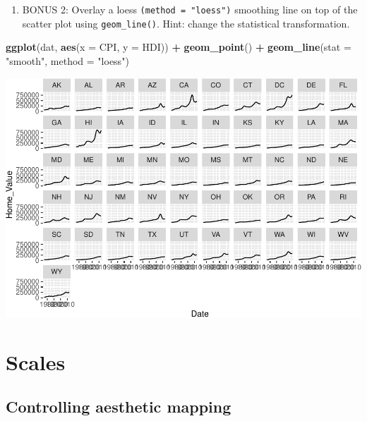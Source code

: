 \documentclass[]{book}
\newenvironment{Shaded}{\begin{snugshade}}{\end{snugshade}}
\newcommand{\DataTypeTok}[1]{\textcolor[rgb]{0.13,0.29,0.53}{#1}}
\newcommand{\KeywordTok}[1]{\textcolor[rgb]{0.13,0.29,0.53}{\textbf{#1}}}
\newcommand{\NormalTok}[1]{#1}
\newcommand{\OperatorTok}[1]{\textcolor[rgb]{0.81,0.36,0.00}{\textbf{#1}}}
\newcommand{\StringTok}[1]{\textcolor[rgb]{0.31,0.60,0.02}{#1}}
\providecommand{\tightlist}{%
  \setlength{\itemsep}{0pt}\setlength{\parskip}{0pt}}
\begin{document}
\begin{enumerate}
\def\labelenumi{\arabic{enumi}.}
\setcounter{enumi}{5}
\tightlist
\item
  BONUS 2: Overlay a loess \texttt{(method\ =\ "loess")} smoothing line on top of the scatter plot using \texttt{geom\_line()}. Hint: change the statistical transformation.
\end{enumerate}

\begin{Shaded}
\begin{Highlighting}[]
\KeywordTok{ggplot}\NormalTok{(dat, }\KeywordTok{aes}\NormalTok{(}\DataTypeTok{x =}\NormalTok{ CPI, }\DataTypeTok{y =}\NormalTok{ HDI)) }\OperatorTok{+}
\StringTok{  }\KeywordTok{geom_point}\NormalTok{() }\OperatorTok{+}
\StringTok{  }\KeywordTok{geom_line}\NormalTok{(}\DataTypeTok{stat =} \StringTok{"smooth"}\NormalTok{, }\DataTypeTok{method =} \StringTok{"loess"}\NormalTok{)}
\end{Highlighting}
\end{Shaded}

\includegraphics{R/Rgraphics/figures/unnamed-chunk-181-1.pdf}

\hypertarget{scales}{%
\section{Scales}\label{scales}}

\hypertarget{controlling-aesthetic-mapping}{%
\subsection{Controlling aesthetic mapping}\label{controlling-aesthetic-mapping}}
\end{document}

